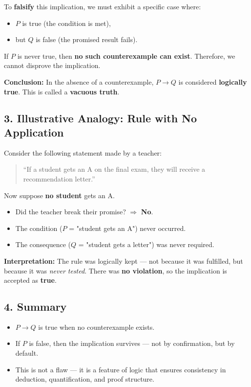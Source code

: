 \documentclass[10pt]{article}
\theoremstyle{plain}
\theoremstyle{definition}
\begin{document}
  To \textbf{falsify} this implication, we must exhibit a specific case where:
  \begin{itemize}
  	\item $P$ is true (the condition is met),
  	\item but $Q$ is false (the promised result fails).
  \end{itemize}
  
  If $P$ is never true, then \textbf{no such counterexample can exist}. Therefore, we cannot disprove the implication.
  
  \textbf{Conclusion:}  
  In the absence of a counterexample, $P \rightarrow Q$ is considered \textbf{logically true}. This is called a \textbf{vacuous truth}.
  
  \subsection*{3. Illustrative Analogy: Rule with No Application}
  
  Consider the following statement made by a teacher:
  \begin{quote}
  	“If a student gets an A on the final exam, they will receive a recommendation letter.”
  \end{quote}
  
  Now suppose \textbf{no student} gets an A.
  
  \begin{itemize}
  	\item Did the teacher break their promise? $\Rightarrow$ \textbf{No}.
  	\item The condition ($P$ = "student gets an A") never occurred.
  	\item The consequence ($Q$ = "student gets a letter") was never required.
  \end{itemize}
  
  \textbf{Interpretation:}  
  The rule was logically kept — not because it was fulfilled, but because it was \textit{never tested}. There was \textbf{no violation}, so the implication is accepted as \textbf{true}.
  
  \subsection*{4. Summary}
  
  \begin{itemize}
  	\item $P \rightarrow Q$ is true when no counterexample exists.
  	\item If $P$ is false, then the implication survives — not by confirmation, but by default.
  	\item This is not a flaw — it is a feature of logic that ensures consistency in deduction, quantification, and proof structure.
  \end{itemize}
 
\end{document}
